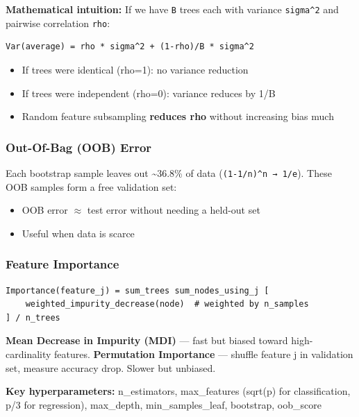 \documentclass[11pt]{article}
\providecommand{\tightlist}{\setlength{\itemsep}{1pt}\setlength{\parskip}{0pt}}
\begin{document}
\textbf{Mathematical intuition:} If we have \texttt{B} trees each with variance \texttt{sigma\^{}2} and pairwise correlation \texttt{rho}:

\setcodelang{}

\begin{verbatim}
Var(average) = rho * sigma^2 + (1-rho)/B * sigma^2
\end{verbatim}

\begin{itemize}
\tightlist
\item
  If trees were identical (rho=1): no variance reduction
\item
  If trees were independent (rho=0): variance reduces by 1/B
\item
  Random feature subsampling \textbf{reduces rho} without increasing bias much
\end{itemize}

\subsubsection{Out-Of-Bag (OOB) Error}\label{out-of-bag-oob-error}

Each bootstrap sample leaves out \textasciitilde36.8\% of data (\texttt{(1-1/n)\^{}n\ →\ 1/e}). These OOB samples form a free validation set:

\begin{itemize}
\tightlist
\item
  OOB error \(\approx\) test error without needing a held-out set
\item
  Useful when data is scarce
\end{itemize}

\subsubsection{Feature Importance}\label{feature-importance}

\setcodelang{}

\begin{verbatim}
Importance(feature_j) = sum_trees sum_nodes_using_j [
    weighted_impurity_decrease(node)  # weighted by n_samples
] / n_trees
\end{verbatim}

\textbf{Mean Decrease in Impurity (MDI)} --- fast but biased toward high-cardinality features.
\textbf{Permutation Importance} --- shuffle feature j in validation set, measure accuracy drop. Slower but unbiased.

\textbf{Key hyperparameters:} n\_estimators, max\_features (sqrt(p) for classification, p/3 for regression), max\_depth, min\_samples\_leaf, bootstrap, oob\_score
\end{document}
